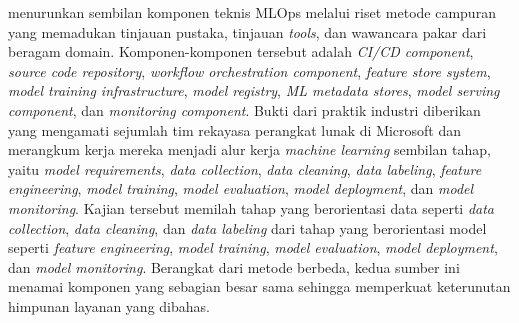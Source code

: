 \textcite{kreuzberger2023mlops} menurunkan sembilan komponen teknis MLOps melalui riset metode campuran yang memadukan tinjauan pustaka, tinjauan \textit{tools}, dan wawancara pakar dari beragam domain. Komponen-komponen tersebut adalah \textit{CI/CD component}, \textit{source code repository}, \textit{workflow orchestration component}, \textit{feature store system}, \textit{model training infrastructure}, \textit{model registry}, \textit{ML metadata stores}, \textit{model serving component}, dan \textit{monitoring component}. Bukti dari praktik industri diberikan \textcite{amershi2019software} yang mengamati sejumlah tim rekayasa perangkat lunak di Microsoft dan merangkum kerja mereka menjadi alur kerja \textit{machine learning} sembilan tahap, yaitu \textit{model requirements}, \textit{data collection}, \textit{data cleaning}, \textit{data labeling}, \textit{feature engineering}, \textit{model training}, \textit{model evaluation}, \textit{model deployment}, dan \textit{model monitoring}. Kajian tersebut memilah tahap yang berorientasi data seperti \textit{data collection}, \textit{data cleaning}, dan \textit{data labeling} dari tahap yang berorientasi model seperti \textit{feature engineering}, \textit{model training}, \textit{model evaluation}, \textit{model deployment}, dan \textit{model monitoring}. Berangkat dari metode berbeda, kedua sumber ini menamai komponen yang sebagian besar sama sehingga memperkuat keterunutan himpunan layanan yang dibahas.

